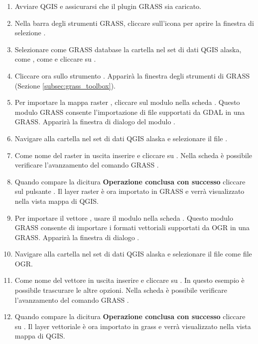 \begin{enumerate}
  \item Avviare QGIS e assicurarsi che il plugin GRASS sia caricato.
  \item Nella barra degli strumenti GRASS, cliccare sull'icona
   per aprire la finestra di
  selezione .
  \item Selezionare come GRASS database la cartella  nel
  set di dati QGIS alaska, come , come
    e cliccare su .
  \item Cliccare ora sullo strumento . Apparirà la finestra degli strumenti di GRASS (Sezione \ref{subsec:grass_toolbox}).
  \item Per importare la mappa raster , cliccare sul
  modulo  nella scheda . Questo
  modulo GRASS consente l'importazione di file supportati da GDAL in una
   GRASS. Apparirà la finestra di dialogo del modulo
  .
  \item Navigare alla cartella  nel set
  di dati QGIS alaska e selezionare il file .
  \item Come nome del raster in uscita inserire  e
  cliccare su . Nella scheda  è possibile
  verificare l'avanzamento del comando GRASS .
  \item Quando compare la dicitura \textbf{Operazione conclusa con successo}
  cliccare sul pulsante . Il layer raster
   è ora importato in GRASS e verrà visualizzato
  nella vista mappa di QGIS.
  \item Per importare il vettore ,
  usare il modulo  nella scheda .
  Questo modulo GRASS consente di importare i formati vettoriali supportati da
  OGR in una  GRASS. Apparirà la finestra di dialogo .
  \item Navigare alla cartella  nel set di dati
  QGIS alaska e selezionare il file  come file OGR.
  \item Come nome del vettore in uscita inserire
   e cliccare su . In questo esempio è
  possibile trascurare le altre opzioni. Nella scheda  è
  possibile verificare l'avanzamento del comando GRASS .
  \item Quando compare la dicitura \textbf{Operazione conclusa con successo}
  cliccare su . Il layer vettoriale
   è ora importato in grass e verrà visualizzato nella
  vista mappa di QGIS. 
\end{enumerate}

